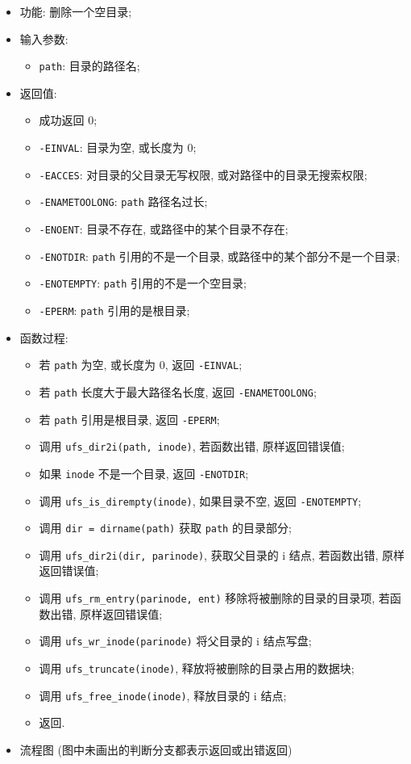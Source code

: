 \documentclass[nofonts]{ctexart}
\begin{document}
  \begin{itemize}
\item
  功能: 删除一个空目录;
\item
  输入参数:

  \begin{itemize}
  \item
    \texttt{path}: 目录的路径名;
  \end{itemize}
\item
  返回值:

  \begin{itemize}
  \item
    成功返回 0;
  \item
    \texttt{-EINVAL}: 目录为空, 或长度为 0;
  \item
    \texttt{-EACCES}: 对目录的父目录无写权限,
    或对路径中的目录无搜索权限;
  \item
    \texttt{-ENAMETOOLONG}: \texttt{path} 路径名过长;
  \item
    \texttt{-ENOENT}: 目录不存在, 或路径中的某个目录不存在;
  \item
    \texttt{-ENOTDIR}: \texttt{path} 引用的不是一个目录,
    或路径中的某个部分不是一个目录;
  \item
    \texttt{-ENOTEMPTY}: \texttt{path} 引用的不是一个空目录;
  \item
    \texttt{-EPERM}: \texttt{path} 引用的是根目录;
  \end{itemize}
\item
  函数过程:

  \begin{itemize}
  \item
    若 \texttt{path} 为空, 或长度为 0, 返回 \texttt{-EINVAL};
  \item
    若 \texttt{path} 长度大于最大路径名长度, 返回
    \texttt{-ENAMETOOLONG};
  \item
    若 \texttt{path} 引用是根目录, 返回 \texttt{-EPERM};
  \item
    调用 \texttt{ufs\_dir2i(path, inode)}, 若函数出错, 原样返回错误值;
  \item
    如果 \texttt{inode} 不是一个目录, 返回 \texttt{-ENOTDIR};
  \item
    调用 \texttt{ufs\_is\_dirempty(inode)}, 如果目录不空, 返回
    \texttt{-ENOTEMPTY};
  \item
    调用 \texttt{dir = dirname(path)} 获取 \texttt{path} 的目录部分;
  \item
    调用 \texttt{ufs\_dir2i(dir, parinode)}, 获取父目录的 i 结点,
    若函数出错, 原样返回错误值;
  \item
    调用 \texttt{ufs\_rm\_entry(parinode, ent)}
    移除将被删除的目录的目录项, 若函数出错, 原样返回错误值;
  \item
    调用 \texttt{ufs\_wr\_inode(parinode)} 将父目录的 i 结点写盘;
  \item
    调用 \texttt{ufs\_truncate(inode)}, 释放将被删除的目录占用的数据块;
  \item
    调用 \texttt{ufs\_free\_inode(inode)}, 释放目录的 i 结点;
  \item
    返回.
  \end{itemize}
\item
  流程图
  (图中未画出的判断分支都表示返回或出错返回)


\end{itemize}
\end{document}
